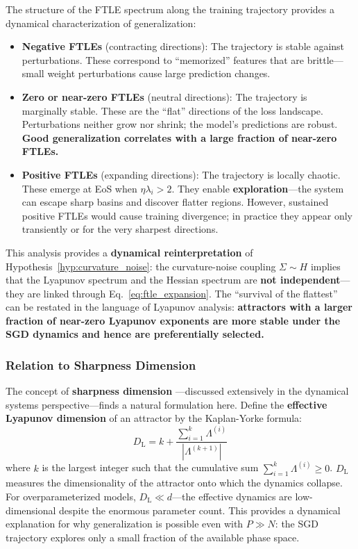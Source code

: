 \documentclass[
  journal=largetwo,
  year=2025,
  volume=37,
]{cup-journal}
\begin{document}
The structure of the FTLE spectrum along the training trajectory provides a dynamical characterization of generalization:
\begin{itemize}
    \item \textbf{Negative FTLEs} (contracting directions): The trajectory is stable against perturbations. These correspond to ``memorized'' features that are brittle---small weight perturbations cause large prediction changes.
    \item \textbf{Zero or near-zero FTLEs} (neutral directions): The trajectory is marginally stable. These are the ``flat'' directions of the loss landscape. Perturbations neither grow nor shrink; the model's predictions are robust. \textbf{Good generalization correlates with a large fraction of near-zero FTLEs.}
    \item \textbf{Positive FTLEs} (expanding directions): The trajectory is locally chaotic. These emerge at EoS when $\eta \lambda_i > 2$. They enable \textbf{exploration}---the system can escape sharp basins and discover flatter regions. However, sustained positive FTLEs would cause training divergence; in practice they appear only transiently or for the very sharpest directions.
\end{itemize}

This analysis provides a \textbf{dynamical reinterpretation} of Hypothesis~\ref{hyp:curvature_noise}: the curvature-noise coupling $\Sigma \sim H$ implies that the Lyapunov spectrum and the Hessian spectrum are \textbf{not independent}---they are linked through Eq.~\eqref{eq:ftle_expansion}. The ``survival of the flattest'' can be restated in the language of Lyapunov analysis: \textbf{attractors with a larger fraction of near-zero Lyapunov exponents are more stable under the SGD dynamics and hence are preferentially selected.}

\subsubsection{Relation to Sharpness Dimension}

The concept of \textbf{sharpness dimension} \cite{cohen2021gradient}---discussed extensively in the dynamical systems perspective---finds a natural formulation here. Define the \textbf{effective Lyapunov dimension} of an attractor by the Kaplan-Yorke formula:
\begin{equation}\label{eq:lyapunov_dim}
    D_{\mathrm{L}} = k + \frac{\sum_{i=1}^{k} \Lambda^{(i)}}{|\Lambda^{(k+1)}|}
\end{equation}
where $k$ is the largest integer such that the cumulative sum $\sum_{i=1}^{k} \Lambda^{(i)} \geq 0$. $D_{\mathrm{L}}$ measures the dimensionality of the attractor onto which the dynamics collapse. For overparameterized models, $D_{\mathrm{L}} \ll d$---the effective dynamics are low-dimensional despite the enormous parameter count. This provides a dynamical explanation for why generalization is possible even with $P \gg N$: the SGD trajectory explores only a small fraction of the available phase space.
\end{document}
